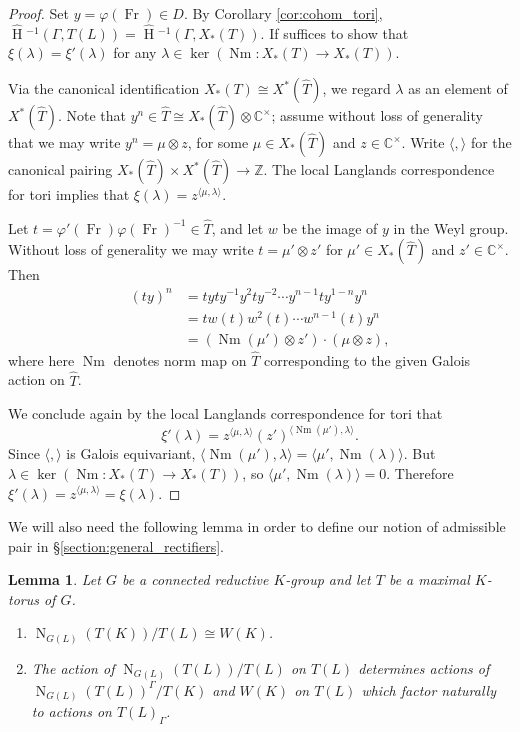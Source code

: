 \documentclass{amsart}
\theoremstyle{plain}
\newtheorem{lemma}[theorem]{Lemma}
\newcommand{\HT}[1]{\hat{\HH}{}^{#1}}
\theoremstyle{definition}
\numberwithin{equation}{section}
\DeclareMathOperator{\HH}{H}
\DeclareMathOperator{\Nm}{Nm}
\DeclareMathOperator{\Fr}{Fr}
\newcommand{\CC}{\mathbb{C}}
\newcommand{\ZZ}{\mathbb{Z}}
\newcommand{\Normalizer}[2]{\operatorname{N}_{#2}(#1)}
\begin{document}
\begin{proof}
Set $y = \varphi(\Fr) \in D$.  By Corollary \ref{cor:cohom_tori},
$\HT{-1}(\Gamma, T(L)) = \HT{-1}(\Gamma, X_*(T))$.
If suffices to show that $\xi(\lambda) = \xi'(\lambda)$ for any $\lambda \in \ker(\Nm : X_*(T) \rightarrow X_*(T))$.

Via the canonical identification $X_*(T) \cong X^*(\hat{T})$,
we regard $\lambda$ as an element of $X^*(\hat{T})$.  Note that $y^n \in \hat{T} \cong X_*(\hat{T}) \otimes \CC^\times$;
assume without loss of generality that we may write $y^n = \mu \otimes z$, for some $\mu \in X_*(\hat{T})$ and
$z \in \CC^{\times}$.  Write $\langle , \rangle$ for the canonical pairing $X_*(\hat{T}) \times X^*(\hat{T}) \to \ZZ$.  The local Langlands
correspondence for tori implies that $\xi(\lambda) = z^{\langle \mu, \lambda \rangle}$.

Let $t = \varphi'(\Fr)\varphi(\Fr)^{-1} \in \hat{T}$, and let $w$ be the image of $y$ in the Weyl group. Without
loss of generality we may write $t = \mu' \otimes z'$ for $\mu' \in X_*(\hat{T})$
and $z' \in \mathbb{C}^{\times}$.  Then
\begin{align*}
(ty)^n &= t yty^{-1} y^2 t y^{-2} \cdots y^{n-1} t y^{1-n} y^n \\
&= t w(t) w^2(t) \cdots w^{n-1}(t) y^n \\
&=(\Nm(\mu' ) \otimes z') \cdot (\mu \otimes z),
\end{align*}
where here $\Nm$ denotes norm map on $\hat{T}$ corresponding to the given Galois action on $\hat{T}$.

We conclude again by the local Langlands correspondence for tori that
\[
\xi'(\lambda) = z^{\langle \mu, \lambda \rangle} (z' )^{\langle \Nm(\mu'), \lambda \rangle}.
\]
Since $\langle , \rangle$ is Galois equivariant, $\langle \Nm(\mu'), \lambda \rangle = \langle\mu', \Nm(\lambda)\rangle$.
But $\lambda \in \ker(\Nm : X_*(T) \rightarrow X_*(T))$, so $\langle\mu', \Nm(\lambda)\rangle = 0$.
Therefore $\xi'(\lambda) = z^{\langle\mu, \lambda\rangle} = \xi(\lambda)$.
\end{proof}

We will also need the following lemma in order to define our notion of admissible pair
in \S\ref{section:general_rectifiers}.

\begin{lemma} \label{lem:weyl_groups}
Let $G$ be a connected reductive $K$-group and let $T$ be a maximal
$K$-torus of $G$.
\begin{enumerate}
\item $\Normalizer{T(K)}{G(L)} / T(L) \cong W(K)$.
\item The action of $\Normalizer{T(L)}{G(L)} / T(L)$ on $T(L)$ determines
actions of $\Normalizer{T(L)}{G(L)}^\Gamma / T(K)$ and $W(K)$
on $T(L)$ which factor naturally to actions on $T(L)_\Gamma$.
\end{enumerate}
\end{lemma}
\end{document}
